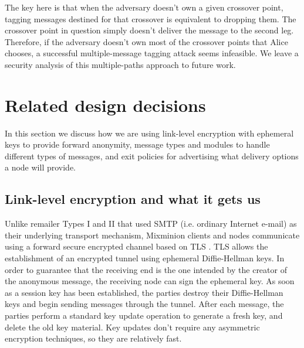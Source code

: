 \documentclass{llncs}
\begin{document}

The key here is that when the adversary doesn't own a given crossover
point, tagging messages destined for that crossover is equivalent to
dropping them.  The crossover point in question simply doesn't deliver
the message to the second leg. Therefore, if the adversary doesn't own
most of the crossover points that Alice chooses, a successful
multiple-message tagging attack seems infeasible.  We leave a security
analysis of this multiple-paths approach to future work.

\section{Related design decisions}

In this section we discuss how we are using
link-level encryption with ephemeral keys to provide forward anonymity,
message types and modules to handle different types of messages, and
exit policies for advertising what delivery options a node will provide.

\subsection{Link-level encryption and what it gets us}
\label{subsec:link-encrypt}

Unlike remailer Types I and II that used SMTP \cite{SMTP} (i.e. ordinary
Internet e-mail) as their underlying transport mechanism, Mixminion
clients and nodes communicate using a forward secure encrypted channel
based on TLS \cite{TLS}.  
TLS allows the establishment of an encrypted tunnel using ephemeral
Diffie-Hellman keys. In order to guarantee that the receiving end is
the one intended by the creator of the anonymous message, the
receiving node can sign the ephemeral key. As soon as a session key
has been established, the parties destroy their Diffie-Hellman keys
and begin sending messages through the tunnel. After each message, the
parties perform a standard key update operation to generate a fresh
key, and delete the old key material.  Key updates don't require any
asymmetric encryption techniques, so they are relatively fast.
\end{document}
